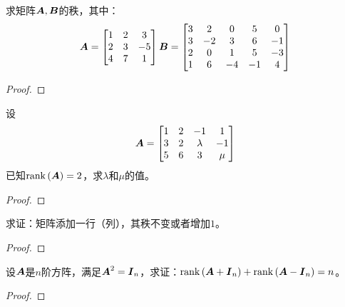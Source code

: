\begin{problem}
求矩阵\(\boldsymbol{A},\boldsymbol{B}\)的秩，其中：
\begin{equation*}
    \boldsymbol{A}=
    \begin{bmatrix}
        1 & 2 & 3  \\
        2 & 3 & -5 \\
        4 & 7 & 1
    \end{bmatrix}\\
    \boldsymbol{B}=
    \begin{bmatrix}
        3 & 2  & 0  & 5  & 0  \\
        3 & -2 & 3  & 6  & -1 \\
        2 & 0  & 1  & 5  & -3 \\
        1 & 6  & -4 & -1 & 4
    \end{bmatrix}
\end{equation*}
\end{problem}
\begin{proof}

\end{proof}

\begin{problem}
设
\begin{equation*}
    \boldsymbol{A}=
    \begin{bmatrix}
        1 & 2 & -1      & 1   \\
        3 & 2 & \lambda & -1  \\
        5 & 6 & 3       & \mu
    \end{bmatrix}
\end{equation*}
已知\(\mathrm{rank}\left( \boldsymbol{A} \right)=2\)，求\(\lambda\)和\(\mu\)的值。
\end{problem}
\begin{proof}

\end{proof}

\begin{problem}
求证：矩阵添加一行（列），其秩不变或者增加\(1\)。
\end{problem}
\begin{proof}

\end{proof}

\begin{problem}
设\(\boldsymbol{A}\)是\(n\)阶方阵，满足\(\boldsymbol{A}^2=\boldsymbol{I}_n\)，求证：\(\mathrm{rank}\left( \boldsymbol{A}+\boldsymbol{I}_n \right)+\mathrm{rank}\left( \boldsymbol{A}-\boldsymbol{I}_n \right)=n\)。
\end{problem}
\begin{proof}

\end{proof}

